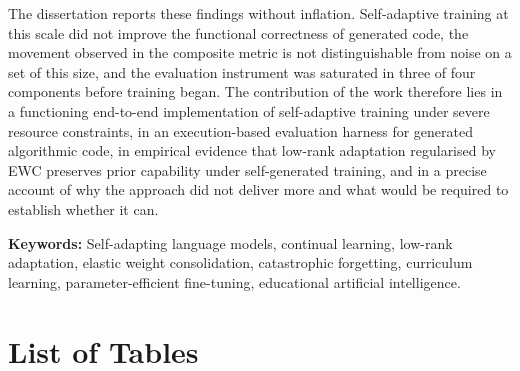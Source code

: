\documentclass[12pt,a4paper]{report}
\begin{document}
The dissertation reports these findings without inflation. Self-adaptive training at this scale did not improve the functional correctness of generated code, the movement observed in the composite metric is not distinguishable from noise on a set of this size, and the evaluation instrument was saturated in three of four components before training began. The contribution of the work therefore lies in a functioning end-to-end implementation of self-adaptive training under severe resource constraints, in an execution-based evaluation harness for generated algorithmic code, in empirical evidence that low-rank adaptation regularised by EWC preserves prior capability under self-generated training, and in a precise account of why the approach did not deliver more and what would be required to establish whether it can.

\vspace{0.5cm}
\noindent\textbf{Keywords:} Self-adapting language models, continual learning, low-rank adaptation, elastic weight consolidation, catastrophic forgetting, curriculum learning, parameter-efficient fine-tuning, educational artificial intelligence.

\clearpage

\tableofcontents
\clearpage

\chapter*{List of Tables}
\begingroup
\singlespacing
\end{document}
